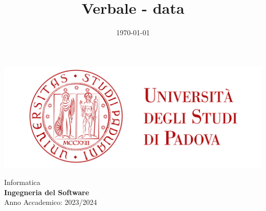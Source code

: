 \documentclass[5pt]{article}
\title{ Verbale - data }
\date{\today}
\begin{document}


    \vspace{8pt}
    \includegraphics[scale=0.2]{UNIPDFull.png}

\vspace{25pt}

\begin{minipage}[t]{0.48\textwidth}
        \begin{flushleft}
            Informatica\\
            \vspace{5pt}
            \textbf{\LARGE Ingegneria del Software}\\
            Anno Accademico: 2023/2024
        \end{flushleft}
\end{minipage}


\vspace{5px}
\end{document}

